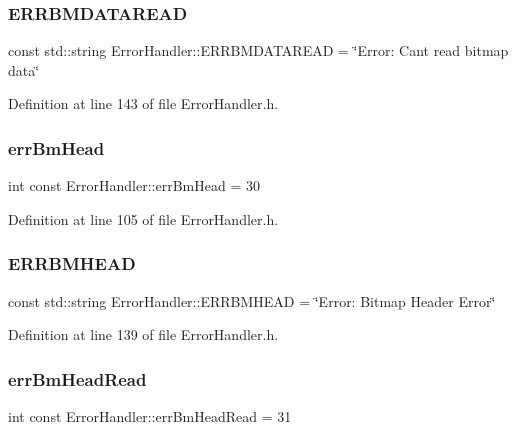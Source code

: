 \subsubsection{\texorpdfstring{ERRBMDATAREAD}{ERRBMDATAREAD}}
{\footnotesize\ttfamily const std\+::string Error\+Handler\+::\+E\+R\+R\+B\+M\+D\+A\+T\+A\+R\+E\+AD = \char`\"{}Error\+: Can\textquotesingle{}t read bitmap data\char`\"{}\hspace{0.3cm}{\ttfamily [static]}}



Definition at line 143 of file Error\+Handler.\+h.

\mbox{\label{classErrorHandler_a9387c79594c780b28b71ec7a6adc5f8c}} 
\subsubsection{\texorpdfstring{errBmHead}{errBmHead}}
{\footnotesize\ttfamily int const Error\+Handler\+::err\+Bm\+Head = 30\hspace{0.3cm}{\ttfamily [static]}}



Definition at line 105 of file Error\+Handler.\+h.

\mbox{\label{classErrorHandler_ace09849c636b0d6692e5437dfd3fb099}} 
\subsubsection{\texorpdfstring{ERRBMHEAD}{ERRBMHEAD}}
{\footnotesize\ttfamily const std\+::string Error\+Handler\+::\+E\+R\+R\+B\+M\+H\+E\+AD = \char`\"{}Error\+: Bitmap Header Error\char`\"{}\hspace{0.3cm}{\ttfamily [static]}}



Definition at line 139 of file Error\+Handler.\+h.

\mbox{\label{classErrorHandler_a8d71033ce6652f30c0ca4f0aa045a0dd}} 
\subsubsection{\texorpdfstring{errBmHeadRead}{errBmHeadRead}}
{\footnotesize\ttfamily int const Error\+Handler\+::err\+Bm\+Head\+Read = 31\hspace{0.3cm}{\ttfamily [static]}}



